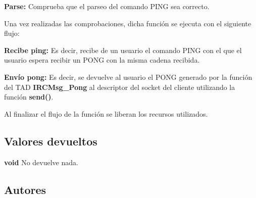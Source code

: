 \begin{DoxyItemize}
\item {\bfseries Parse\+:} Comprueba que el parseo del comando P\+I\+NG sea correcto. 
\end{DoxyItemize}

Una vez realizadas las comprobaciones, dicha función se ejecuta con el siguiente flujo\+:


\begin{DoxyItemize}
\item {\bfseries Recibe ping\+:} Es decir, recibe de un usuario el comando P\+I\+NG con el que el usuario espera recibir un P\+O\+NG con la misma cadena recibida.  
\item {\bfseries Envío pong\+:} Es decir, se devuelve al usuario el P\+O\+NG generado por la función del T\+AD {\bfseries I\+R\+C\+Msg\+\_\+\+Pong} al descriptor del socket del cliente utilizando la función {\bfseries send()}. 
\end{DoxyItemize}

Al finalizar el flujo de la función se liberan los recursos utilizados.\hypertarget{server_command_ping_return_ping}{}\subsection{Valores devueltos}\label{server_command_ping_return_ping}

\begin{DoxyItemize}
\item {\bfseries void} No devuelve nada. 
\end{DoxyItemize}\hypertarget{server_command_ping_authors_ping}{}\subsection{Autores}\label{server_command_ping_authors_ping}

